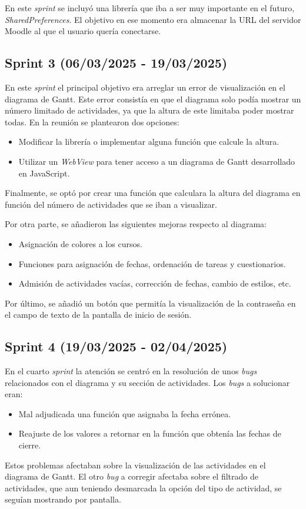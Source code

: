 En este \textit{sprint} se incluyó una librería que iba a ser muy importante en el futuro, \textit{SharedPreferences}. El objetivo en ese momento era almacenar la URL del servidor Moodle al que el usuario quería conectarse.

\subsection{Sprint 3 (06/03/2025 - 19/03/2025)}
En este \textit{sprint} el principal objetivo era arreglar un error de visualización en el diagrama de Gantt. Este error consistía en que el diagrama solo podía mostrar un número limitado de actividades, ya que la altura de este limitaba poder mostrar todas. En la reunión se plantearon dos opciones:
\begin{itemize}
    \item Modificar la librería o implementar alguna función que calcule la altura.
    \item Utilizar un \textit{WebView} para tener acceso a un diagrama de Gantt desarrollado en JavaScript.
\end{itemize}
Finalmente, se optó por crear una función que calculara la altura del diagrama en función del número de actividades que se iban a visualizar.

Por otra parte, se añadieron las siguientes mejoras respecto al diagrama:
\begin{itemize}
    \item Asignación de colores a los cursos.
    \item Funciones para asignación de fechas, ordenación de tareas y cuestionarios.
    \item Admisión de actividades vacías, corrección de fechas, cambio de estilos, etc.
\end{itemize}

Por último, se añadió un botón que permitía la visualización de la contraseña en el campo de texto de la pantalla de inicio de sesión.

\subsection{Sprint 4 (19/03/2025 - 02/04/2025)}
En el cuarto \textit{sprint} la atención se centró en la resolución de unos \textit{bugs} relacionados con el diagrama y su sección de actividades. Los \textit{bugs} a solucionar eran:
\begin{itemize}
    \item Mal adjudicada una función que asignaba la fecha errónea.
    \item Reajuste de los valores a retornar en la función que obtenía las fechas de cierre.
\end{itemize}
Estos problemas afectaban sobre la visualización de las actividades en el diagrama de Gantt. El otro \textit{bug} a corregir afectaba sobre el filtrado de actividades, que aun teniendo desmarcada la opción del tipo de actividad, se seguían mostrando por pantalla.

